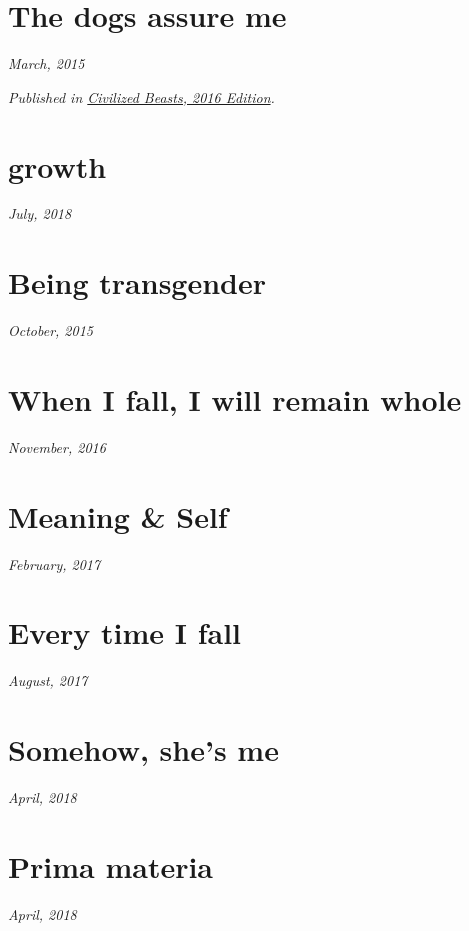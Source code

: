 \documentclass[10pt]{memoir}
\begin{document}
  \section{The dogs assure me}

  \hfill\textit{March, 2015}

  

  \textit{Published in \underline{Civilized Beasts, 2016 Edition}.}
  \cleartoverso


  \section{growth}

  \hfill\textit{July, 2018}

  
  \newpage


  \section{Being transgender}

  \hfill\textit{October, 2015}

  
  \newpage


  \section{When I fall, I will remain whole}

  \hfill\textit{November, 2016}

  
  \cleartoverso


  \section{Meaning \& Self}

  \hfill\textit{February, 2017}

  
  \newpage

  \section{Every time I fall}

  \hfill\textit{August, 2017}

  
  \newpage


  \section{Somehow, she's me}

  \hfill\textit{April, 2018}

  
  \newpage


  \section{Prima materia}

  \hfill\textit{April, 2018}

  
\end{document}
